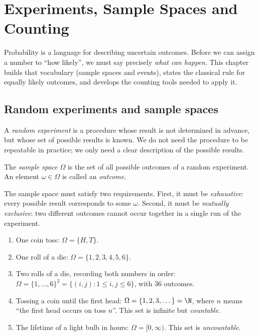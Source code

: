 \chapter{Experiments, Sample Spaces and Counting}
\label{ch:counting}

Probability is a language for describing uncertain outcomes. Before we can
assign a number to ``how likely'', we must say precisely \emph{what can
happen}. This chapter builds that vocabulary (sample spaces and events), states
the classical rule for equally likely outcomes, and develops the counting tools
needed to apply it.

\section{Random experiments and sample spaces}

A \emph{random experiment} is a procedure whose result is not determined in
advance, but whose set of possible results is known. We do not need the
procedure to be repeatable in practice; we only need a clear description of the
possible results.

\begin{definition}
The \emph{sample space} $\Omega$ is the set of all possible outcomes of a
random experiment. An element $\omega\in\Omega$ is called an \emph{outcome}.
\end{definition}

The sample space must satisfy two requirements. First, it must be
\emph{exhaustive}: every possible result corresponds to some $\omega$. Second,
it must be \emph{mutually exclusive}: two different outcomes cannot occur
together in a single run of the experiment.

\begin{example}\label{ex:spaces}
\begin{enumerate}[label=(\alph*)]
\item One coin toss: $\Omega=\{H,T\}$.
\item One roll of a die: $\Omega=\{1,2,3,4,5,6\}$.
\item Two rolls of a die, recording both numbers in order:
$\Omega=\{1,\dots,6\}^2=\{(i,j):1\le i,j\le 6\}$, with $36$ outcomes.
\item Tossing a coin until the first head: $\Omega=\{1,2,3,\dots\}=\N$, where
$n$ means ``the first head occurs on toss $n$''. This set is infinite but
\emph{countable}.
\item The lifetime of a light bulb in hours: $\Omega=[0,\infty)$. This set is
\emph{uncountable}.
\end{enumerate}
\end{example}

